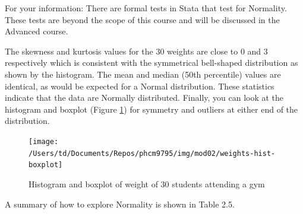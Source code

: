 \documentclass[
]{memoir}
\begin{document}
For your information: There are formal tests in Stata that test for Normality. These tests are beyond the scope of this course and will be discussed in the Advanced course.

The skewness and kurtosis values for the 30 weights are close to 0 and 3 respectively which is consistent with the symmetrical bell-shaped distribution as shown by the histogram. The mean and median (50th percentile) values are identical, as would be expected for a Normal distribution. These statistics indicate that the data are Normally distributed. Finally, you can look at the histogram and boxplot (Figure \ref{fig:fig-2-6}) for symmetry and outliers at either end of the distribution.

\begin{figure}
\texttt{[image: /Users/td/Documents/Repos/phcm9795/img/mod02/weights-hist-boxplot]} \caption{Histogram and boxplot of weight of 30 students attending a gym}\label{fig:fig-2-6}
\end{figure}

A summary of how to explore Normality is shown in Table 2.5.

 
  \providecommand{\huxb}[2]{\arrayrulecolor[RGB]{#1}\global\arrayrulewidth=#2pt}
  \providecommand{\huxvb}[2]{\color[RGB]{#1}\vrule width #2pt}
  \providecommand{\huxtpad}[1]{\rule{0pt}{#1}}
  \providecommand{\huxbpad}[1]{\rule[-#1]{0pt}{#1}}
\end{document}
